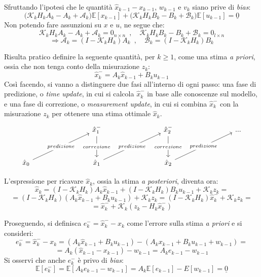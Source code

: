 \documentclass[12pt,a4paper,openright,twoside]{book}
\begin{document}
Sfruttando l'ipotesi che le quantità $\hat{x}_{k-1}-x_{k-1}$, $w_{k-1}$ e $v_k$ siano prive di \textit{bias}:
$$\bigl(\mathcal{K}_kH_kA_k-A_k+\mathcal{A}_k\bigr)\mathbb{E}[x_{k-1}]+\bigl(\mathcal{K}_kH_kB_k-B_k+\mathcal{B}_k\bigr)\mathbb{E}[u_{k-1}]=\underline{0}$$
Non potendo fare assunzioni su $x$ e $u$, ne segue che:
$$\mathcal{K}_kH_kA_k-A_k+\mathcal{A}_k=0_{n\times n}\enspace,\quad\mathcal{K}_kH_kB_k-B_k+\mathcal{B}_k=0_{l\times n}$$
$$\Rightarrow\mathcal{A}_k=(I-\mathcal{K}_kH_k)A_k\enspace,\quad\mathcal{B}_k=(I-\mathcal{K}_kH_k)B_k$$

Risulta pratico definire la seguente quantità, per $k\geq 1$, come una stima \textit{a priori}, ossia che non tenga conto della misurazione $z_k$:
$$\hat{x}_k^-=A_k\hat{x}_{k-1}+B_ku_{k-1}$$
Così facendo, si vanno a distinguere due fasi all'interno di ogni passo: una fase di predizione, o \textit{time update}, in cui si calcola $\hat{x}_k^-$ in base alle conoscenze sul modello, e una fase di correzione, o \textit{measurement update}, in cui si combina $\hat{x}_k^-$ con la misurazione $z_k$ per ottenere una stima ottimale $\hat{x}_k$.
\begin{equation*}
\begin{tikzcd}[row sep=3em, column sep=8em]
& \hat{x}_1^-\arrow[d, "correzione" description] & \hat{x}_2^-\arrow[d, "correzione" description] & ... \\
\hat{x}_0\arrow[ur, "predizione" description] & \hat{x}_1\arrow[ur, "predizione" description] & \hat{x}_2\arrow[ur, "predizione" description] &
\end{tikzcd}
\end{equation*}
\vspace{1em}

L'espressione per ricavare $\hat{x}_k$, ossia la stima \textit{a posteriori}, diventa ora:
$$\hat{x}_k=(I-\mathcal{K}_kH_k)A_k\hat{x}_{k-1}+(I-\mathcal{K}_kH_k)B_ku_{k-1}+\mathcal{K}_kz_k=$$
$$=(I-\mathcal{K}_kH_k)(A_k\hat{x}_{k-1}+B_ku_{k-1})+\mathcal{K}_kz_k=(I-\mathcal{K}_kH_k)\hat{x}_k^-+\mathcal{K}_kz_k=$$
$$=\hat{x}_k^-+\mathcal{K}_k(z_k-H_k\hat{x}_k^-)$$

Proseguendo, si definisca $e_k^-=\hat{x}_k^--x_k$ come l'errore sulla stima \textit{a priori} e si consideri:
$$e_k^-=\hat{x}_k^--x_k=(A_k\hat{x}_{k-1}+B_ku_{k-1})-(A_kx_{k-1}+B_ku_{k-1}+w_{k-1})=$$
$$=A_k(\hat{x}_{k-1}-x_{k-1})-w_{k-1}=A_ke_{k-1}-w_{k-1}$$
Si osservi che anche $e_k^-$ è privo di \textit{bias}:
$$\mathbb{E}[e_k^-]=\mathbb{E}[A_ke_{k-1}-w_{k-1}]=A_k\mathbb{E}[e_{k-1}]-E[w_{k-1}]=\underline{0}$$
\end{document}
